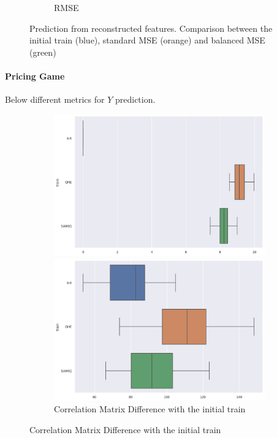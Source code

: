 \documentclass{article}
\theoremstyle{definition}
\begin{document}
\begin{figure}[H]
\begin{subfigure}[b]{0.49\textwidth}
         \caption{RMSE}
     \end{subfigure}
     \caption{Prediction from reconstructed features. Comparison between the initial train (blue), standard MSE (orange) and balanced MSE (green)}
\end{figure}



\newpage
\paragraph{Pricing Game}Below different metrics for $Y$ prediction.
\begin{figure}[H]
     \centering
     \begin{subfigure}[b]{0.49\textwidth}
         \centering
         \includegraphics[width=\textwidth]{imgs/PricingGame/boxplot_MC.png}
         \caption{Correlation Matrix Difference with the initial train}
         \quad
         \includegraphics[width=\textwidth]{imgs/PricingGame/boxplot_MAE.png}

\end{subfigure}
\end{figure}
\end{document}

